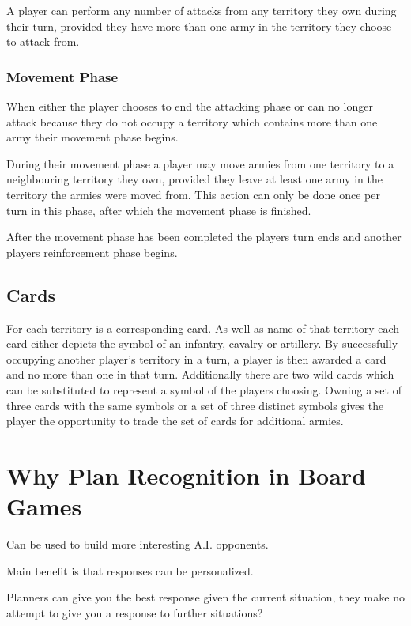 \documentclass[parskip]{cs4rep}
\begin{document}
A player can perform any number of attacks from any territory they own during their turn, provided they have more than one army in the territory they choose to attack from.

\subsubsection{Movement Phase}

When either the player chooses to end the attacking phase or can no longer attack because they do not occupy a territory which contains more than one army their movement phase begins.

During their movement phase a player may move armies from one territory to a neighbouring territory they own, provided they leave at least one army in the territory the armies were moved from. This action can only be done once per turn in this phase, after which the movement phase is finished.

After the movement phase has been completed the players turn ends and another players reinforcement phase begins.
\newpage

\subsection{Cards}

For each territory is a corresponding card. As well as name of that territory each card either depicts the symbol of an infantry, cavalry or artillery. By successfully occupying another player's territory in a turn, a player is then awarded a card and no more than one in that turn. Additionally there are two wild cards which can be substituted to represent a symbol of the players choosing. Owning a set of three cards with the same symbols or a set of three distinct symbols gives the player the opportunity to trade the set of cards for additional armies.

\section{Why Plan Recognition in Board Games}

Can be used to build more interesting A.I. opponents.

Main benefit is that responses can be personalized.

Planners can give you the best response given the current situation, they make no attempt to give you a response to further situations?
\end{document}
